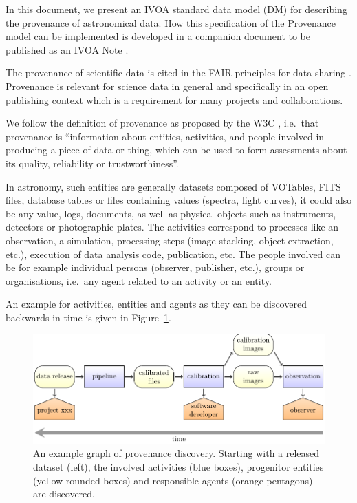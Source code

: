 
In this document, we present an IVOA standard data model (DM) for describing the provenance of astronomical data.
How this specification of the Provenance model can be implemented is developed in a companion document to be published as an IVOA Note \citep{std:ProvenanceImplementationNote}.

The provenance of scientific data is cited in the FAIR principles for data sharing \citep{FAIR-principles}.
Provenance is relevant for science data in general and specifically in an open publishing context which is a requirement for many
projects and collaborations.

We follow the definition of provenance as proposed by the W3C \citep{std:W3CProvDM}, i.e.~that provenance is ``information about entities, activities, and people involved in producing a piece of data or thing, which can be used to form assessments about its quality, reliability or trustworthiness''.

In astronomy, such entities are generally datasets composed of VOTables, FITS files, database tables or files containing values (spectra, light curves),  it could also be any value, logs, documents, as well as physical objects such as instruments, detectors or photographic plates.
The activities correspond to processes like an observation, a simulation, processing steps (image stacking, object extraction, etc.), execution of data analysis code, publication, etc.
The people involved can be for example individual persons (observer, publisher, etc.), groups or organisations, i.e.~any agent related to an activity or an entity.

An example for activities, entities and agents as they can be discovered backwards in time is given in Figure~\ref{fig:example-workflow}.


\begin{figure}[ht]
\centering
\includegraphics[width=1\textwidth]{workflow-backwards.pdf}
\caption[Example graph of provenance discovery]{An example graph of provenance discovery. Starting with a released dataset (left), the involved activities (blue boxes), 
progenitor entities (yellow rounded boxes) and responsible agents (orange pentagons) are 
discovered.}
\label{fig:example-workflow}
\end{figure}


